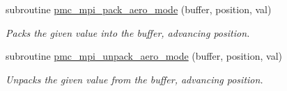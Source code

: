 \begin{DoxyCompactItemize}
subroutine \mbox{\hyperlink{namespacepmc__aero__mode_a33ac48c507ea64a72353c01a32dc43c1}{pmc\+\_\+mpi\+\_\+pack\+\_\+aero\+\_\+mode}} (buffer, position, val)
\begin{DoxyCompactList}\small\item\em Packs the given value into the buffer, advancing position. \end{DoxyCompactList}\item 
subroutine \mbox{\hyperlink{namespacepmc__aero__mode_a2c5e4a5984c400daaa6b5723662122f3}{pmc\+\_\+mpi\+\_\+unpack\+\_\+aero\+\_\+mode}} (buffer, position, val)
\begin{DoxyCompactList}\small\item\em Unpacks the given value from the buffer, advancing position. \end{DoxyCompactList}\end{DoxyCompactItemize}
